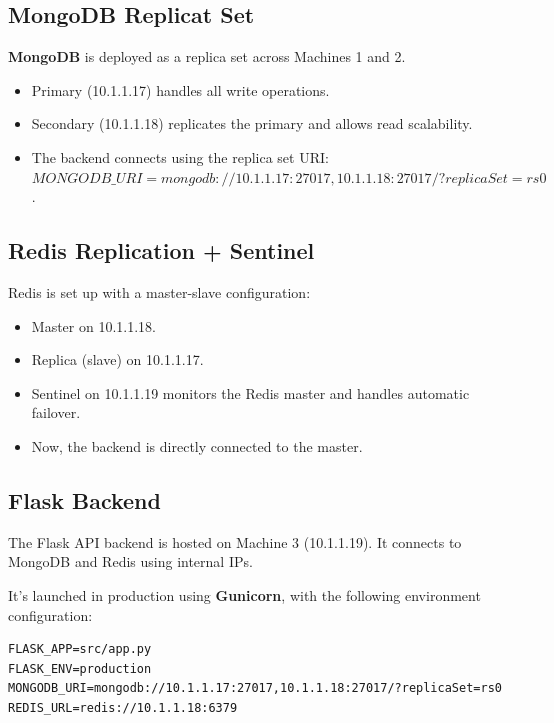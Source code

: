 \subsection{MongoDB Replicat Set}\label{subsec:mongodb-replicat-set}

\textbf{MongoDB} is deployed as a replica set across Machines 1 and 2.

\begin{itemize}
  \item Primary (10.1.1.17) handles all write operations.
  \item Secondary (10.1.1.18) replicates the primary and allows read scalability.
  \item The backend connects using the replica set URI: $MONGODB\_URI=mongodb://10.1.1.17:27017,10.1.1.18:27017/?replicaSet=rs0$.
\end{itemize}

\subsection{Redis Replication + Sentinel}\label{subsec:redis-replication-+-sentinel}

Redis is set up with a master-slave configuration:

\begin{itemize}
  \item Master on 10.1.1.18.
  \item Replica (slave) on 10.1.1.17.
  \item Sentinel on 10.1.1.19 monitors the Redis master and handles automatic failover.
  \item Now, the backend is directly connected to the master.
\end{itemize}

\subsection{Flask Backend}\label{subsec:flask-backend}

The Flask API backend is hosted on Machine 3 (10.1.1.19).
It connects to MongoDB and Redis using internal IPs.

It's launched in production using \textbf{Gunicorn}, with the following environment configuration:


\begin{lstlisting}[style=bashstyle,label={lst:flask-api-backend-environment},caption={Flask API Backend Environment}]
FLASK_APP=src/app.py
FLASK_ENV=production
MONGODB_URI=mongodb://10.1.1.17:27017,10.1.1.18:27017/?replicaSet=rs0
REDIS_URL=redis://10.1.1.18:6379
\end{lstlisting}

